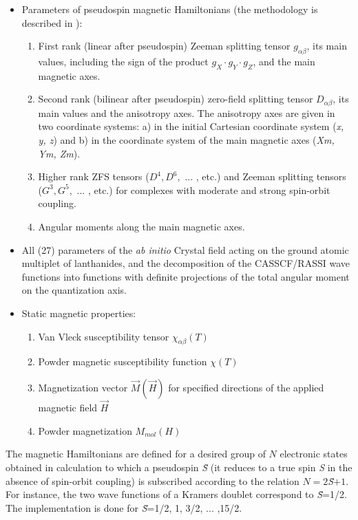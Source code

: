 \begin {itemize}
\item Parameters of pseudospin magnetic Hamiltonians (the methodology is described in \cite{Chibotaru:3}):
\begin {enumerate}
\item First rank (linear after pseudospin) Zeeman splitting tensor $g_{\alpha\beta}$, its main values, including the sign of the product $g_{X} \cdot g_{Y} \cdot g_{Z}$, and the main magnetic axes.
\item Second rank (bilinear after pseudospin) zero-field splitting tensor $D_{\alpha\beta}$, its main values and the anisotropy axes. The anisotropy axes are given in two coordinate systems: a) in the initial Cartesian coordinate system ({\it x, y, z}) and b) in the coordinate system of the main magnetic axes ({\it Xm, Ym, Zm}).
\item Higher rank ZFS tensors ($D^4, D^6, $ ... , etc.) and Zeeman splitting tensors ($G^3, G^5,$ ... , etc.) for complexes with moderate and strong spin-orbit coupling.
\item Angular moments along the main magnetic axes.
\end {enumerate}

\item All (27) parameters of the {\it ab initio} Crystal field acting on the ground atomic multiplet of lanthanides, and the decomposition of the CASSCF/RASSI wave functions into functions with definite projections of the total angular moment on the quantization axis.

\item Static magnetic properties:
\begin {enumerate}
\item Van Vleck susceptibility tensor  $\chi_{\alpha\beta}(T)$
\item Powder magnetic susceptibility function ${\chi}(T)$
\item Magnetization vector $\vec M (\vec H)$ for specified directions of the applied magnetic field $\vec H$
\item Powder magnetization ${M_{mol}(H)}$
\end {enumerate}
\end {itemize}

The magnetic Hamiltonians are defined for a desired group of $N$ electronic states obtained in  calculation to which a pseudospin \textit{\~S} (it reduces to a true spin \textit{S} in the absence of spin-orbit coupling) is subscribed according to the relation $N=2$\textit{\~S}$+1$. For instance, the two wave functions of a Kramers doublet correspond to \textit{\~S}=1/2. The implementation is done for \textit{\~S}=1/2, 1, 3/2, ... ,15/2.


